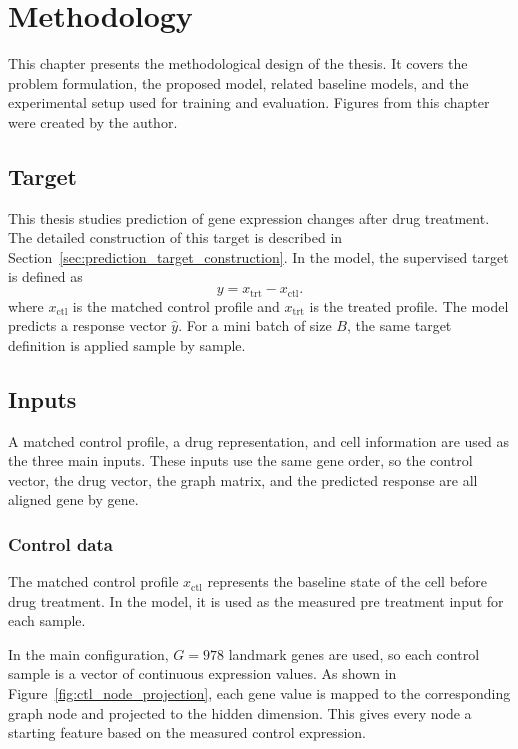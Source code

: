 \chapter{Methodology}
\noindent This chapter presents the methodological design of the thesis. It covers the problem formulation, the proposed model, related baseline models, and the experimental setup used for training and evaluation. Figures from this chapter were created by the author.

\section{Target}
This thesis studies prediction of gene expression changes after drug treatment. The detailed construction of this target is described in Section~\ref{sec:prediction_target_construction}. In the model, the supervised target is defined as
\begin{equation}
y = x_{\mathrm{trt}} - x_{\mathrm{ctl}}.
\end{equation}
\noindent where $x_{\mathrm{ctl}}$ is the matched control profile and $x_{\mathrm{trt}}$ is the treated profile. The model predicts a response vector $\hat{y}$. For a mini batch of size $B$, the same target definition is applied sample by sample.

\section{Inputs}
\noindent A matched control profile, a drug representation, and cell information are used as the three main inputs. These inputs use the same gene order, so the control vector, the drug vector, the graph matrix, and the predicted response are all aligned gene by gene.

\subsection{Control data}
The matched control profile $x_{\mathrm{ctl}}$ represents the baseline state of the cell before drug treatment. In the model, it is used as the measured pre treatment input for each sample.

\noindent In the main configuration, $G=978$ landmark genes are used, so each control sample is a vector of continuous expression values. As shown in Figure~\ref{fig:ctl_node_projection}, each gene value is mapped to the corresponding graph node and projected to the hidden dimension. This gives every node a starting feature based on the measured control expression.

